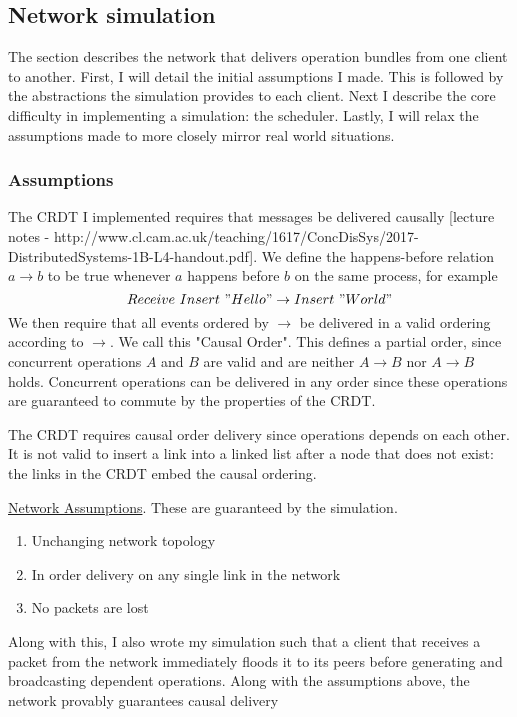 \documentclass[12pt,a4paper,twoside,openright]{report}
\begin{document}
	\subsection{Network simulation}
		The section describes the network that delivers operation bundles from one client to another. First, I will detail the initial assumptions I made. This is followed by the abstractions the simulation provides to each client. Next I describe the core difficulty in implementing a simulation: the scheduler. Lastly, I will relax the assumptions made to more closely mirror real world situations.
		
		\subsubsection{Assumptions} 
		The CRDT I implemented requires that messages be delivered causally [lecture notes - http://www.cl.cam.ac.uk/teaching/1617/ConcDisSys/2017-DistributedSystems-1B-L4-handout.pdf]. We define the happens-before relation \(a \rightarrow b\) to be true whenever $a$ happens before $b$ on the same process, for example \[Receive\ Insert\ "Hello" \rightarrow Insert\ " World"\]
		We then require that all events ordered by $\rightarrow$ be delivered in a valid ordering according to $\rightarrow$. We call this "Causal Order". 	
		This defines a partial order, since concurrent operations $A$ and $B$ are valid and are neither $A \rightarrow B$ nor $A \rightarrow B$ holds. Concurrent operations can be delivered in any order since these operations are guaranteed to commute by the properties of the CRDT.
		
		The CRDT requires causal order delivery since operations depends on each other. It is not valid to insert a link into a linked list after a node that does not exist: the links in the CRDT embed the causal ordering.
		
		\underline{Network Assumptions}. These are guaranteed by the simulation.
		\begin{enumerate}
			\item Unchanging network topology
			\item In order delivery on any single link in the network
			\item No packets are lost
		\end{enumerate}
		
		Along with this, I also wrote my simulation such that a client that receives a packet from the network immediately floods it to its peers before generating and broadcasting dependent operations. Along with the assumptions above, the network provably guarantees causal delivery
		
\end{document}

